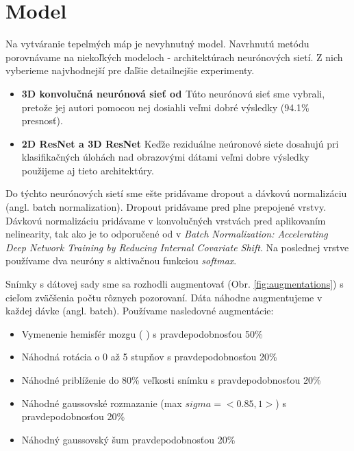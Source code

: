 
\section{Model \label{sec:design_model}}

Na vytváranie tepelmých máp je nevyhnutný model. Navrhnutú metódu porovnávame na niekoľkých modeloch - architektúrach neurónových sietí. Z nich vyberieme najvhodnejší pre ďaľšie detailnejšie experimenty.

\begin{itemize}
    \item \textbf{3D konvolučná neurónová sieť od \citeauthor*{esmaeilzadeh2018end}} Túto neurónovú sieť sme vybrali, pretože jej autori pomocou nej dosiahli veľmi dobré výsledky (94.1\% presnosť).
    \item \textbf{2D ResNet a 3D ResNet} Keďže reziduálne neúronové siete dosahujú pri klasifikačných úlohách nad obrazovými dátami veľmi dobre výsledky použijeme aj tieto architektúry.
\end{itemize}

Do týchto neurónových sietí sme ešte pridávame dropout a dávkovú normalizáciu (angl. batch normalization). Dropout pridávame pred plne prepojené vrstvy. Dávkovú normalizáciu pridávame v konvolučných vrstvách pred aplikovaním nelinearity, tak ako je to odporučené od \citeauthor*{ioffe2015batch} v \textit{Batch Normalization: Accelerating Deep Network Training by Reducing Internal Covariate Shift}. Na poslednej vrstve používame dva neuróny s aktivačnou funkciou \textit{softmax}.

Snímky s dátovej sady sme sa rozhodli augmentovať (Obr. \ref{fig:augmentations}) s cieľom zväčšenia počtu rôznych pozorovaní. Dáta náhodne augmentujeme v každej dávke (angl. batch). Používame nasledovné augmentácie:

\begin{itemize}
    \item Vymenenie hemisfér mozgu (\citeauthor*{esmaeilzadeh2018end} \cite{esmaeilzadeh2018end}) s pravdepodobnosťou 50\%
    \item Náhodná rotácia o 0 až 5 stupňov s pravdepodobnosťou 20\%
    \item Náhodné priblíženie do 80\% veľkosti snímku s pravdepodobnosťou 20\%
    \item Náhodné gaussovské rozmazanie (max $sigma = <0.85, 1>$) s pravdepodobnosťou 20\%
    \item Náhodný gaussovský šum pravdepodobnosťou 20\%
\end{itemize}

